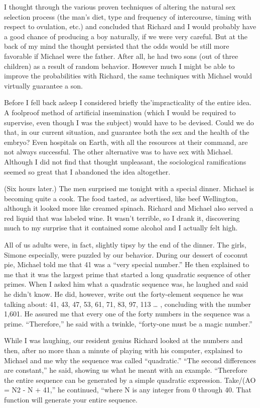 \documentclass[]{article}
\begin{document}
I thought through the various proven techniques of altering the natural sex selection process (the man’s diet, type and frequency of intercourse, timing with respect to ovulation, etc.) and concluded that Richard and I would probably have a good chance of producing a boy naturally, if we were very careful. But at the back of my mind the thought persisted that the odds would be still more favorable if Michael were the father. After all, he had two sons (out of three children) as a result of random behavior. However much I might be able to improve the probabilities with Richard, the same techniques with Michael would virtually guarantee a son.

Before I fell back asleep I considered briefly the’impracticality of the entire idea. A foolproof method of artificial insemination (which I would be required to supervise, even though I was the subject) would have to be devised. Could we do that, in our current situation, and guarantee both the sex and the health of the embryo? Even hospitals on Earth, with all the resources at their command, are not always successful. The other alternative was to have sex with Michael. Although I did not find that thought unpleasant, the sociological ramifications seemed so great that I abandoned the idea altogether.

(Six hours later.) The men surprised me tonight with a special dinner. Michael is becoming quite a cook. The food tasted, as advertised, like beef Wellington, although it looked more like creamed spinach. Richard and Michael also served a red liquid that was labeled wine. It wasn’t terrible, so I drank it, discovering much to my surprise that it contained some alcohol and I actually felt high.

All of us adults were, in fact, slightly tipsy by the end of the dinner. The girls, Simone especially, were puzzled by our behavior. During our dessert of coconut pie, Michael told me that 41 was a “very special number.” He then explained to me that it was the largest prime that started a long quadratic sequence of other primes. When I asked him what a quadratic sequence was, he laughed and said he didn’t know. He did, however, write out the forty-element sequence he was talking about: 41, 43, 47, 53, 61, 71, 83, 97, 113 … , concluding with the number 1,601. He assured me that every one of the forty numbers in the sequence was a prime. “Therefore,” he said with a twinkle, “forty-one must be a magic number.”

While I was laughing, our resident genius Richard looked at the numbers and then, after no more than a minute of playing with his computer, explained to Michael and me why the sequence was called “quadratic.” “The second differences are constant,” he said, showing us what he meant with an example. “Therefore the entire sequence can be generated by a simple quadratic expression. Take/(AO = N2 - N + 41,” he continued, “where N is any integer from 0 through 40. That function will generate your entire sequence.
\end{document}
